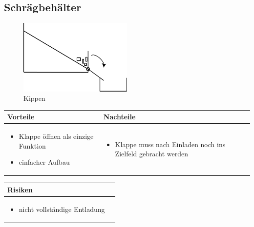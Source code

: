 \pagebreak


\subsection{Schrägbehälter}

\begin{figure} [hbp]
	\centering
	\includegraphics[width=0.5\textwidth]{fig/Entladen_Schraegbehaelter.png}
	\caption{Kippen}
\end{figure}

\begin{table}[h]
\begin{tabular}{p{} | p{}}


 \textbf{Vorteile} & \textbf{Nachteile} \\ \hline
	 
\begin{itemize}
\item Klappe öffnen als einzige Funktion
\item einfacher Aufbau
\end{itemize}

 
 &
 
\begin{itemize}
\item Klappe muss nach Einladen noch ins Zielfeld gebracht werden
\end{itemize}

\end{tabular}
\end{table}

\begin{table}[h]
\begin{tabular}{p{}p{}}


 \textbf{Risiken} & \\ \hline
	 
\begin{itemize}
\item nicht vollständige Entladung
\end{itemize}

 
\end{tabular}
\end{table}

\pagebreak